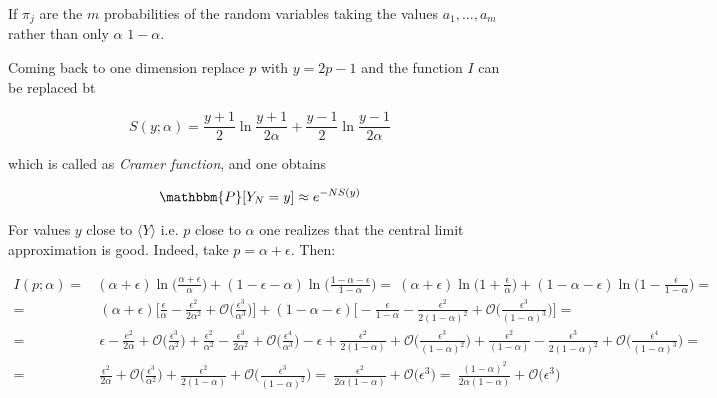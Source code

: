 \documentclass{article}
\begin{document}
If $\pi_j$ are the $m$ probabilities of the random variables taking the values $a_1,...,a_m$ rather than only $\alpha$ $1-\alpha$. 

Coming back to one dimension replace $p$ with $y=2p-1$ and the function $I$ can be replaced bt

$$ S(y;\alpha) = \frac{y+1}{2} \ln \frac{y+1}{2\alpha} + \frac{y-1}{2} \ln \frac{y-1}{2\alpha}$$

which is called as \emph{Cramer function}, and one obtains 

\begin{equation}
 \mathbbm{P}[Y_N = y] \approx e^{-NS(y)}
\end{equation}

For values $y$ close to $\langle Y \rangle$ i.e. $p$ close to $\alpha$ one realizes that the central limit approximation is good. Indeed, take $p=\alpha + \epsilon $. Then:

\begin{align*}
I(p;\alpha) = & (\alpha + \epsilon) \ln \Big (\frac{\alpha + \epsilon}{\alpha} \Big )+ (1-\epsilon  - \alpha) \ln  \Big ( \frac{1 - \alpha - \epsilon}{1-\alpha} \Big ) = \ (\alpha + \epsilon ) \ln \Big (1 + \frac{\epsilon}{\alpha} \Big ) + (1 -\alpha - \epsilon) \ln \Big (1 - \frac{\epsilon}{1-\alpha} \Big ) = \\
= & \ (\alpha + \epsilon ) \Big [\frac{\epsilon}{\alpha} - \frac{\epsilon^2}{2 \alpha^2} + \mathcal{O} \Big (\frac{\epsilon^3}{\alpha^3} \Big ) \Big ] + (1-\alpha -\epsilon) \Big [- \frac{\epsilon}{1 - \alpha} - \frac{\epsilon^2}{2(1-\alpha)^2} + \mathcal{O} \Big (\frac{\epsilon^3}{(1-\alpha)^3} \Big ) \Big ] = \\
= & \ \epsilon - \frac{e^2}{2\alpha} + \mathcal{O} \Big (\frac{\epsilon^3}{\alpha^2} \Big ) + \frac{\epsilon^2}{\alpha^2} - \frac{\epsilon^3}{2 \alpha^2} + \mathcal{O} \Big (\frac{\epsilon^4}{\alpha^3} \Big ) - \epsilon + \frac{\epsilon^2}{2(1-\alpha)} +  \mathcal{O} \Big (\frac{\epsilon^3}{(1-\alpha)^2} \Big ) +  \frac{\epsilon^2}{(1-\alpha)} -  \frac{\epsilon^3}{2(1-\alpha)^2} + \mathcal{O}\Big ( \frac{\epsilon^4}{(1-\alpha)^3} \Big ) = \\
= & \ \frac{\epsilon^2}{2 \alpha} + \mathcal{O}\Big ( \frac{\epsilon^3}{\alpha^2} \Big ) +  \frac{\epsilon^2}{2(1-\alpha)} + \mathcal{O} \Big (\frac{\epsilon^3}{(1-\alpha)^2} \Big ) = \ \frac{\epsilon^2}{2\alpha(1-\alpha)} + \mathcal{O} \Big (\epsilon^3 \Big ) = \ \frac{(1-\alpha)^2}{2\alpha(1-\alpha)} +  \mathcal{O} \Big (\epsilon^3 \Big ) 
\end{align*}
\end{document}
